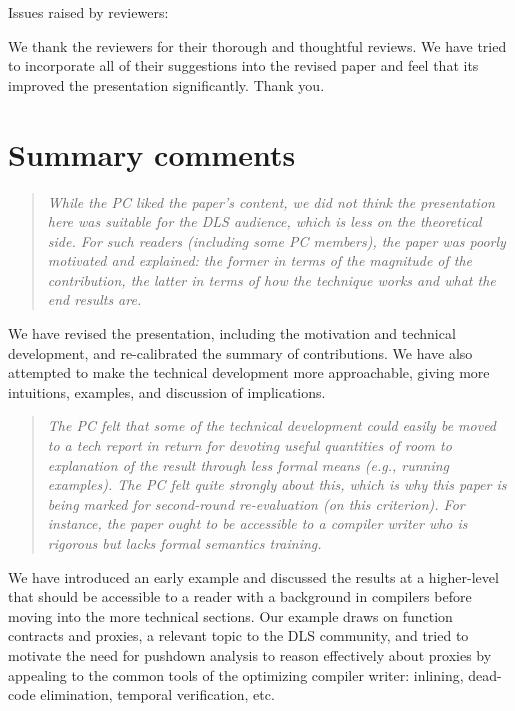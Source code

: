 \begin{titlepage}
  \begin{center}
    \Large{Issues raised by reviewers:}
  \end{center}


We thank the reviewers for their thorough and thoughtful reviews.  We
have tried to incorporate all of their suggestions into the revised
paper and feel that its improved the presentation significantly.  Thank you.

\section*{Summary comments}

\begin{quote}
\emph{
While the PC liked the paper's content, we did not think the
presentation here was suitable for the DLS audience, which is less on
the theoretical side. For such readers (including some PC members),
the paper was poorly motivated and explained: the former in terms of
the magnitude of the contribution, the latter in terms of how the
technique works and what the end results are.}
\end{quote}

We have revised the presentation, including the motivation and
technical development, and re-calibrated the summary of contributions.
We have also attempted to make the technical development more
approachable, giving more intuitions, examples, and discussion of
implications.

\begin{quote}
\emph{
The PC felt that some of the technical development could easily be
moved to a tech report in return for devoting useful quantities of
room to explanation of the result through less formal means (e.g.,
running examples). The PC felt quite strongly about this, which is why
this paper is being marked for second-round re-evaluation (on this
criterion). For instance, the paper ought to be accessible to a
compiler writer who is rigorous but lacks formal semantics training.}
\end{quote}

We have introduced an early example and discussed the results at a
higher-level that should be accessible to a reader with a background
in compilers before moving into the more technical sections.  Our
example draws on function contracts and proxies, a relevant topic to
the DLS community, and tried to motivate the need for pushdown
analysis to reason effectively about proxies by appealing to the
common tools of the optimizing compiler writer: inlining, dead-code
elimination, temporal verification, etc.


\end{titlepage}
